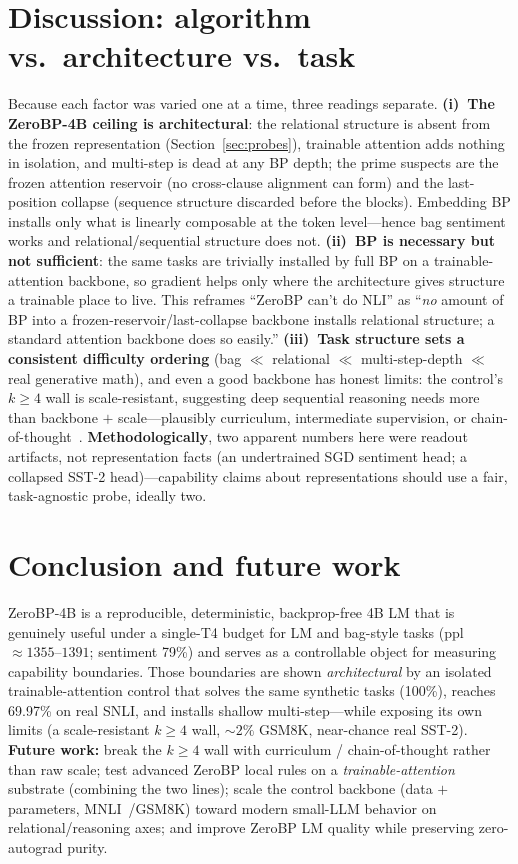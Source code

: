 \documentclass[11pt]{article}
\newcommand{\zbp}{ZeroBP-4B}
\begin{document}
\section{Discussion: algorithm vs.\ architecture vs.\ task}

Because each factor was varied one at a time, three readings separate. \textbf{(i)~The \zbp{} ceiling is
architectural}: the relational structure is absent from the frozen representation
(Section~\ref{sec:probes}), trainable attention adds nothing in isolation, and multi-step is dead at any BP
depth; the prime suspects are the frozen attention reservoir (no cross-clause alignment can form) and the
last-position collapse (sequence structure discarded before the blocks). Embedding BP installs only what is
linearly composable at the token level---hence bag sentiment works and relational/sequential structure does
not. \textbf{(ii)~BP is necessary but not sufficient}: the same tasks are trivially installed by full BP on
a trainable-attention backbone, so gradient helps only where the architecture gives structure a trainable
place to live. This reframes ``ZeroBP can't do NLI'' as ``\emph{no} amount of BP into a
frozen-reservoir/last-collapse backbone installs relational structure; a standard attention backbone does so
easily.'' \textbf{(iii)~Task structure sets a consistent difficulty ordering} (bag $\ll$ relational $\ll$
multi-step-depth $\ll$ real generative math), and even a good backbone has honest limits: the control's
$k \ge 4$ wall is scale-resistant, suggesting deep sequential reasoning needs more than backbone $+$
scale---plausibly curriculum, intermediate supervision, or chain-of-thought~\cite{wei2022cot}.
\textbf{Methodologically}, two apparent numbers here were readout artifacts, not representation facts (an
undertrained SGD sentiment head; a collapsed SST-2 head)---capability claims about representations should use
a fair, task-agnostic probe, ideally two.

\section{Conclusion and future work}

\zbp{} is a reproducible, deterministic, backprop-free 4B LM that is genuinely useful under a single-T4
budget for LM and bag-style tasks (ppl $\approx 1355$--$1391$; sentiment 79\%) and serves as a controllable
object for measuring capability boundaries. Those boundaries are shown \emph{architectural} by an isolated
trainable-attention control that solves the same synthetic tasks (100\%), reaches 69.97\% on real SNLI, and
installs shallow multi-step---while exposing its own limits (a scale-resistant $k \ge 4$ wall, ${\sim}2\%$
GSM8K, near-chance real SST-2). \textbf{Future work:} break the $k \ge 4$ wall with curriculum /
chain-of-thought rather than raw scale; test advanced ZeroBP local rules on a \emph{trainable-attention}
substrate (combining the two lines); scale the control backbone (data $+$ parameters,
MNLI~\cite{williams2018mnli}/GSM8K) toward modern small-LLM behavior on relational/reasoning axes; and improve
ZeroBP LM quality while preserving zero-autograd purity.
\end{document}
